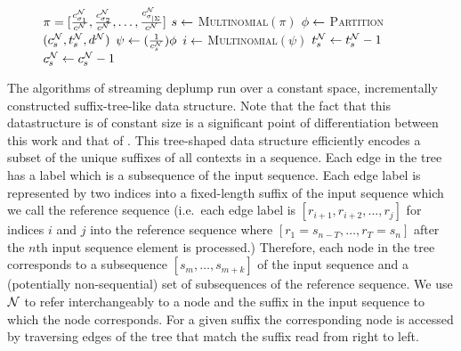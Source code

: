 \begin{figure*}[ttt!]
\begin{minipage}[t]{.48\linewidth}
\begin{algorithm}[H]
\begin{algorithmic}[1]
			\State $\pi = [\frac{c^\N_{\sigma_1}}{c^\N}, \frac{c^\N_{\sigma_2}}{c^\N}, \ldots, \frac{c^\N_{\sigma_{|\Sigma}}}{c^\N}]$
			\State $s \la $ \textsc{Multinomial}$(\pi)$ %
			\State $\phi \la$ \textsc{Partition}$(c^\N_s, t^\N_s, d^{\N})$
			\State $\psi \la (\frac{1}{c^\N_{s}} ) \phi$
			\State $i \la$ \textsc{Multinomial}$(\psi)$
				\State $t^\N_s \la t^\N_s - 1$
			\EndIf
			\State $c^\N_s \la c^\N_s - 1$
		\EndWhile
	\EndFunction	
	\end{algorithmic}	
\end{algorithm}
	\end{minipage}
	\end{figure*}

The algorithms of streaming deplump run over a constant space, incrementally constructed suffix-tree-like data structure.  Note that the fact that this datastructure is of constant size is a significant point of  differentiation between this work and that of \cite{Gasthaus2010}. This tree-shaped data structure efficiently encodes a subset of the unique suffixes of all contexts in a sequence.  Each edge in the tree has a label which is a subsequence of the input sequence.  Each edge label is represented by two indices into a fixed-length suffix of the input sequence which we call the reference sequence (i.e.~each edge label is $[r_{i+1}, r_{i+2}, \ldots,r_{j}]$ for indices $i$ and $j$ into the reference sequence where $[r_{1} = s_{n-T}, \ldots, r_T = s_n]$ after the $n$th input sequence element is processed.)  
Therefore, each node in the tree corresponds to a subsequence $[s_m, \ldots, s_{m + k}]$ of the input sequence and a (potentially non-sequential) set of subsequences of the reference sequence.  
We use $\N$ to refer interchangeably to a node and the suffix in the input sequence to which the node corresponds.  For a given suffix the corresponding node is accessed by traversing edges of the tree that match the suffix read from right to left. 
%

